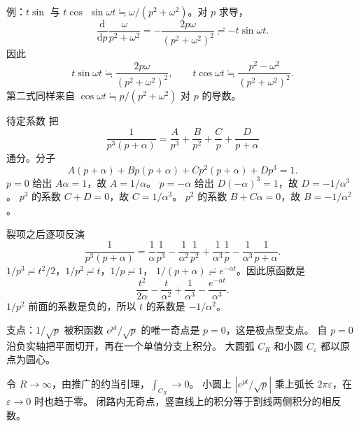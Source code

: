 \documentclass[fontset=windows, chinese, 10pt, xcolor=dvipsnames]{beamer}
\begin{document}
\begin{frame}{例：$t\sin$ 与 $t\cos$}
  $\sin\omega t\fallingdotseq\omega/(p^2+\omega^2)$。对 $p$ 求导，
  \begin{equation*}
    \frac{\mathrm{d}}{\mathrm{d}p}\frac{\omega}{p^2+\omega^2}
    =-\frac{2p\omega}{(p^2+\omega^2)^2}
    \risingdotseq -t\sin\omega t.
  \end{equation*}
  因此
  \begin{equation*}
    t\sin\omega t
    \fallingdotseq\frac{2p\omega}{(p^2+\omega^2)^2},
    \qquad
    t\cos\omega t
    \fallingdotseq\frac{p^2-\omega^2}{(p^2+\omega^2)^2}.
  \end{equation*}
  第二式同样来自 $\cos\omega t\fallingdotseq p/(p^2+\omega^2)$ 对 $p$ 的导数。
\end{frame}

\begin{frame}{待定系数}
  把
  \begin{equation*}
    \frac{1}{p^3(p+\alpha)}
    =\frac{A}{p^3}+\frac{B}{p^2}+\frac{C}{p}+\frac{D}{p+\alpha}
  \end{equation*}
  通分。分子
  \begin{equation*}
    A(p+\alpha)+Bp(p+\alpha)+Cp^2(p+\alpha)+Dp^3=1.
  \end{equation*}
  $p=0$ 给出 $A\alpha=1$，故 $A=1/\alpha$。
  $p=-\alpha$ 给出 $D(-\alpha)^3=1$，故 $D=-1/\alpha^3$。
  $p^3$ 的系数 $C+D=0$，故 $C=1/\alpha^3$。
  $p^2$ 的系数 $B+C\alpha=0$，故 $B=-1/\alpha^2$。
\end{frame}

\begin{frame}{裂项之后逐项反演}
  \begin{equation*}
    \frac{1}{p^3(p+\alpha)}
    =\frac{1}{\alpha}\frac{1}{p^3}
     -\frac{1}{\alpha^2}\frac{1}{p^2}
     +\frac{1}{\alpha^3}\frac{1}{p}
     -\frac{1}{\alpha^3}\frac{1}{p+\alpha}.
  \end{equation*}
  $1/p^3\risingdotseq t^2/2$，$1/p^2\risingdotseq t$，$1/p\risingdotseq 1$，
  $1/(p+\alpha)\risingdotseq e^{-\alpha t}$。因此原函数是
  \begin{equation*}
    \frac{t^2}{2\alpha}-\frac{t}{\alpha^2}
    +\frac{1}{\alpha^3}-\frac{e^{-\alpha t}}{\alpha^3}.
  \end{equation*}
  $1/p^2$ 前面的系数是负的，所以 $t$ 的系数是 $-1/\alpha^2$。
\end{frame}

\begin{frame}{支点：$1/\sqrt{p}$}
  被积函数 $e^{pt}/\sqrt{p}$ 的唯一奇点是 $p=0$，这是极点型支点。
  自 $p=0$ 沿负实轴把平面切开，再在一个单值分支上积分。
  大圆弧 $C_R$ 和小圆 $C_\varepsilon$ 都以原点为圆心。
  \vspace{0.3em}

  令 $R\to\infty$，由推广的约当引理，$\displaystyle\int_{C_R}\to 0$。
  小圆上 $|e^{pt}/\sqrt{p}|$ 乘上弧长 $2\pi\varepsilon$，在 $\varepsilon\to 0$ 时也趋于零。
  闭路内无奇点，竖直线上的积分等于割线两侧积分的相反数。
\end{frame}
\end{document}
